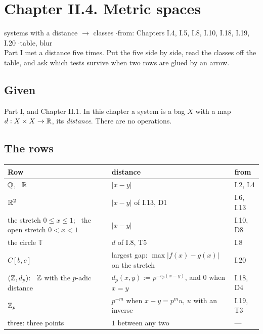 \newpage

\section*{Chapter II.4. Metric spaces}
\begin{center}
{\normalsize systems with a distance $\to$ classes \quad$\cdot$\quad from: Chapters I.4, I.5, I.8, I.10, I.18, I.19, I.20 \quad$\cdot$\quad table, blur}\\[4pt]
{\small Part I met a distance five times. Put the five side by side, read the classes off the table, and ask which tests survive when two rows are glued by an arrow.}
\end{center}

\subsection*{Given}

Part I, and Chapter II.1. In this chapter a system is a bag $X$ with a map $d : X \times X \to \mathbb{R}$, its \emph{distance}. There are no operations.

\subsection*{The rows}

\begin{center}
\renewcommand{\arraystretch}{1.3}
{\small
\begin{tabular}{@{}>{\raggedright\arraybackslash}p{5.6cm} >{\raggedright\arraybackslash}p{6.4cm} l@{}}
\textbf{Row} & \textbf{distance} & \textbf{from} \\ \hline
$\mathbb{Q}$, \ $\mathbb{R}$ & $|x - y|$ & I.2, I.4 \\
$\mathbb{R}^2$ & $|x - y|$ of I.13, D1 & I.6, I.13 \\
the stretch $0 \le x \le 1$; \ the open stretch $0 < x < 1$ & $|x - y|$ & I.10, D8 \\
the circle $\mathbb{T}$ & $d$ of I.8, T5 & I.8 \\
$C[b,c]$ & largest gap: $\max |f(x) - g(x)|$ on the stretch & I.20 \\
$(\mathbb{Z}, d_p)$: \ $\mathbb{Z}$ with the $p$-adic distance & $d_p(x, y) := p^{-v_p(x - y)}$, and $0$ when $x = y$ & I.18, D4 \\
$\mathbb{Z}_p$ & $p^{-m}$ when $x - y = p^m u$, $u$ with an inverse & I.19, T3 \\
$\mathsf{three}$: three points & $1$ between any two & --- \\
\end{tabular}
}
\end{center}

